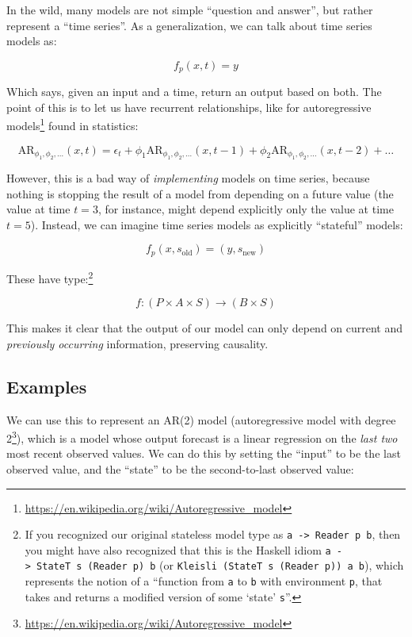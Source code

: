 \documentclass[]{article}
\renewcommand{\href}[2]{#2\footnote{\url{#1}}}
\begin{document}
In the wild, many models are not simple ``question and answer'', but rather
represent a ``time series''. As a generalization, we can talk about time series
models as:

\[
f_p(x,t) = y
\]

Which says, given an input and a time, return an output based on both. The point
of this is to let us have recurrent relationships, like for
\href{https://en.wikipedia.org/wiki/Autoregressive_model}{autoregressive models}
found in statistics:

\[
\text{AR}_{\phi_1, \phi_2, \ldots}(x,t)
  = \epsilon_t + \phi_1 \text{AR}_{\phi_1, \phi_2, \ldots}(x, t-1)
  + \phi_2 \text{AR}_{\phi_1, \phi_2, \ldots}(x, t-2)
  + \ldots
\]

However, this is a bad way of \emph{implementing} models on time series, because
nothing is stopping the result of a model from depending on a future value (the
value at time \(t = 3\), for instance, might depend explicitly only the value at
time \(t = 5\)). Instead, we can imagine time series models as explicitly
``stateful'' models:

\[
f_p(x, s_{\text{old}}) = (y, s_{\text{new}})
\]

These have type:\footnote{If you recognized our original stateless model type as
  \texttt{a\ -\textgreater{}\ Reader\ p\ b}, then you might have also recognized
  that this is the Haskell idiom
  \texttt{a\ -\textgreater{}\ StateT\ s\ (Reader\ p)\ b} (or
  \texttt{Kleisli\ (StateT\ s\ (Reader\ p))\ a\ b}), which represents the notion
  of a ``function from \texttt{a} to \texttt{b} with environment \texttt{p},
  that takes and returns a modified version of some `state' \texttt{s}''.}

\[
f : (P \times A \times S) \rightarrow (B \times S)
\]

This makes it clear that the output of our model can only depend on current and
\emph{previously occurring} information, preserving causality.

\subsection{Examples}\label{examples}

We can use this to represent an AR(2) model
(\href{https://en.wikipedia.org/wiki/Autoregressive_model}{autoregressive model
with degree 2}), which is a model whose output forecast is a linear regression
on the \emph{last two} most recent observed values. We can do this by setting
the ``input'' to be the last observed value, and the ``state'' to be the
second-to-last observed value:
\end{document}
